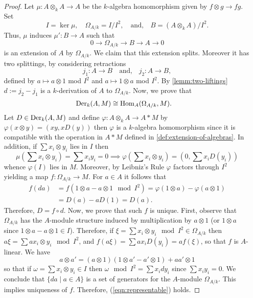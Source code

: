 \begin{proof}
	Let $\mu\colon A \otimes_{k} A \to A$ be the $k$-algebra homomorphism given by $f \otimes g \to fg$. Set
	\[
		I = \ker \mu, \quad \Omega_{A/k} = I/I^{2}, \quad \text{and,} \quad B = (A \otimes_{k} A)/I^{2}.
	\]
	Thus, $\mu$ induces $\mu'\colon B \to A$ such that
	\[
		0 \to \Omega_{A/k} \to B \to A \to 0
	\]
	is an extension of $A$ by $\Omega_{A/k}$. We claim that this extension splits. Moreover it has two splittings, by considering retractions
	\[
		j_{1}\colon A \to B \quad\text{and,}\quad j_{2}\colon A \to B,
	\]
	defined by $a \mapsto a\otimes 1$ mod $I^{2}$ and $a \mapsto 1 \otimes a$ mod $I^{2}$. By \cref{lemm:two-liftings} $d := j_{2} - j_{1}$ is a $k$-derivation of $A$ to $\Omega_{A/k}$. Now, we prove that 
	\begin{align}\label{eqn:representable}
		\operatorname{Der}_{k}(A,M) &\cong \operatorname{Hom}_{A}(\Omega_{A/k}, M).
	\end{align}	
	Let $D \in \operatorname{Der}_{k}(A,M)$ and define $\varphi\colon A \otimes_{k} A \to A * M$ by $\varphi(x \otimes y) = (xy, xD(y))$ then $\varphi$ is a $k$-algebra homomorphism since it is compatible with the operation in $A * M$ defined in \cref{def:extension-of-algebras}. In addition, if $\sum x_{i} \otimes y_{i}$ lies in $I$ then
	\[
		\mu\left(\sum x_{i} \otimes y_{i}\right) = \sum x_{i}y_{i} = 0 \implies \varphi\left(\sum x_{i} \otimes y_{i}\right) = (0, \sum x_{i}D(y_{i}))
	\]
	whence $\varphi(I)$ lies in $M$. Moreover, by Leibniz's Rule $\varphi$ factors through $I^{2}$ yielding a map $f\colon \Omega_{A/k}\to M$. For $a \in A$ it follows that 
	\begin{align*}
		f(da) &= f(1 \otimes a - a \otimes 1 \mod I^{2}) = \varphi(1 \otimes a) - \varphi(a \otimes 1) \\
		&= D(a) - aD(1) = D(a). 
	\end{align*} 	
	Therefore, $D = f\circ d$. Now, we prove that such $f$ is unique. First, observe that $\Omega_{A/k}$ has the $A$-module structure induced by multiplication by $a \otimes 1$ (or $1 \otimes a$ since $1 \otimes a - a \otimes 1 \in I$). Therefore, if $\xi = \sum x_{i} \otimes y_{i} \mod I^{2} \in \Omega_{A/k}$ then $a\xi = \sum ax_{i}\otimes y_{i} \mod I^{2}$, and $f(a\xi) = \sum ax_{i}D(y_{i}) = af(\xi)$, so that $f$ is $A$-linear. We have
	\[
		a \otimes a' = (a \otimes 1)(1 \otimes a' - a' \otimes 1) +  aa' \otimes 1
	\]
	so that if $\omega = \sum x_{i}\otimes y_{i} \in I$ then $\omega \mod I^{2} = \sum x_{i} dy_{i}$ since $\sum x_{i}y_{i} = 0$. We conclude that $\{da\mid a\in A\}$ is a set of generators for the $A$-module $\Omega_{A/k}$. This implies uniqueness of $f$. Therefore, (\ref{eqn:representable}) holds.
\end{proof}
